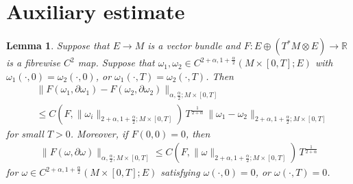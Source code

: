 \documentclass{amsart}
\newtheorem{lemma}[theorem]{Lemma}
\theoremstyle{definition}
\theoremstyle{remark}
\numberwithin{equation}{section}
\newcommand{\R}{\mathbb{R}}
\begin{document}
	
	
	
	
	
	
\bigskip

\appendix

\section{Auxiliary estimate}

	\begin{lemma}\label{lem:auxiliary_estimate}
		Suppose that $E\to M$ is a vector bundle and $F:E\oplus (T^*M\otimes E)\to\R$ is a fibrewise $C^2$ map. Suppose that $\omega_1, \omega_2\in C^{2+\alpha, 1+\frac{\alpha}{2}}(M\times [0,T];E)$ with $\omega_1(\cdot,0) = \omega_2(\cdot,0)$, or $\omega_1(\cdot,T) = \omega_2(\cdot,T)$. Then		
		\begin{align*}
			&\|F(\omega_1,\partial\omega_1) - F(\omega_2,\partial\omega_2)\|_{\alpha,\frac{\alpha}{2};M\times[0,T]}\\
			& \leq C(F,  \|\omega_i\|_{2+\alpha, 1+\frac{\alpha}{2}; M\times [0,T]})\, T^{\frac{1}{2+\alpha}}\, \|\omega_1-\omega_2\|_{2+\alpha, 1+\frac{\alpha}{2}; M\times [0,T]}
		\end{align*}
		for small $T>0$. Moreover, if $F(0,0) = 0$, then		
		\begin{align*}
			\|F(\omega,\partial\omega)\|_{\alpha,\frac{\alpha}{2};M\times[0,T]} \leq C(F,  \|\omega\|_{2+\alpha, 1+\frac{\alpha}{2}; M\times [0,T]})\, T^{\frac{1}{2+\alpha}}
		\end{align*}
		for $\omega\in C^{2+\alpha, 1+\frac{\alpha}{2}}(M\times [0,T];E)$ satisfying $\omega(\cdot,0) = 0$, or $\omega(\cdot,T) = 0$.
	\end{lemma}
\end{document}
